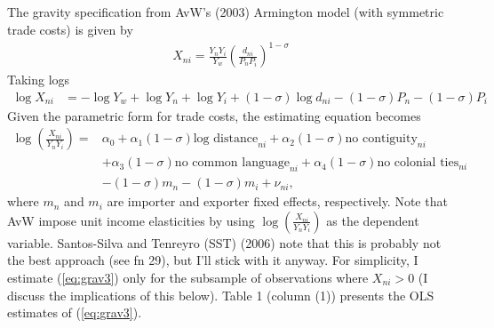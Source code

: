 \documentclass[12pt]{article}
\begin{document}
\subsection{} The gravity specification from AvW's (2003) Armington model (with symmetric trade costs) is given by
\begin{align}
X_{ni} = \frac{Y_nY_i}{Y_w}\left(\frac{d_{ni}}{P_n P_i}\right)^{1-\sigma}  \label{eq:grav1}
\end{align}
Taking logs
\begin{align*}
\log X_{ni} &= - \log Y_w + \log Y_n + \log Y_i + (1-\sigma)\log d_{ni} - (1-\sigma)P_n - (1-\sigma)P_i 
\end{align*}
Given the parametric form for trade costs, the estimating equation becomes
\begin{align}
\log \left(\frac{X_{ni}}{Y_n Y_i}\right) =& \alpha_0 + \alpha_1 (1-\sigma) \text{log distance}_{ni} +  \alpha_2 (1-\sigma) \text{no contiguity}_{ni} \nonumber\\
&+ \alpha_3 (1-\sigma) \text{no common language}_{ni} + \alpha_4 (1-\sigma) \text{no colonial ties}_{ni} \nonumber\\
&- (1-\sigma)m_n - (1-\sigma)m_i + \nu_{ni}, \label{eq:grav3}
\end{align}
where $m_n$ and $m_i$ are importer and exporter fixed effects, respectively. Note that AvW impose unit income elasticities by using $\log \left(\frac{X_{ni}}{Y_n Y_i}\right)$ as the dependent variable. Santos-Silva and Tenreyro (SST) (2006) note that this is probably not the best approach (see fn 29), but I'll stick with it anyway. For simplicity, I estimate (\ref{eq:grav3}) only for the subsample of observations where $X_{ni} >0$ (I discuss the implications of this below). Table 1 (column (1)) presents the OLS estimates of (\ref{eq:grav3}).
\end{document}
